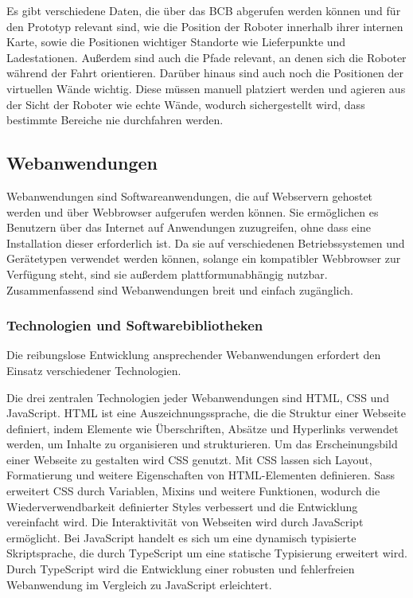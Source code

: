 Es gibt verschiedene Daten, die über das \ac{BCB} abgerufen werden können und für den Prototyp relevant sind, wie die Position der Roboter innerhalb ihrer internen Karte, sowie die Positionen wichtiger Standorte wie Lieferpunkte und Ladestationen. Außerdem sind auch die Pfade relevant, an denen sich die Roboter während der Fahrt orientieren. Darüber hinaus sind auch noch die Positionen der virtuellen Wände wichtig. Diese müssen manuell platziert werden und agieren aus der Sicht der Roboter wie echte Wände, wodurch sichergestellt wird, dass bestimmte Bereiche nie durchfahren werden.

\subsection{Webanwendungen}
Webanwendungen sind Softwareanwendungen, die auf Webservern gehostet werden und über Webbrowser aufgerufen werden können. Sie ermöglichen es Benutzern über das Internet auf Anwendungen zuzugreifen, ohne dass eine Installation dieser erforderlich ist. Da sie auf verschiedenen Betriebssystemen und Gerätetypen verwendet werden können, solange ein kompatibler Webbrowser zur Verfügung steht, sind sie außerdem plattformunabhängig nutzbar. Zusammenfassend sind Webanwendungen breit und einfach zugänglich.

\subsubsection{Technologien und Softwarebibliotheken}\label{sec:WebTechnologies}
Die reibungslose Entwicklung ansprechender Webanwendungen erfordert den Einsatz verschiedener Technologien.

Die drei zentralen Technologien jeder Webanwendungen sind \ac{HTML}, \ac{CSS} und JavaScript. \ac{HTML} ist eine Auszeichnungssprache, die die Struktur einer Webseite definiert, indem Elemente wie Überschriften, Absätze und Hyperlinks verwendet werden, um Inhalte zu organisieren und strukturieren. Um das Erscheinungsbild einer Webseite zu gestalten wird \ac{CSS} genutzt. Mit \ac{CSS} lassen sich Layout, Formatierung und weitere Eigenschaften von \ac{HTML}-Elementen definieren. \ac{Sass} erweitert \ac{CSS} durch Variablen, \gls{Mixins} und weitere Funktionen, wodurch die Wiederverwendbarkeit definierter Styles verbessert und die Entwicklung vereinfacht wird. Die Interaktivität von Webseiten wird durch JavaScript ermöglicht. Bei JavaScript handelt es sich um eine dynamisch typisierte Skriptsprache, die durch TypeScript um eine statische Typisierung erweitert wird. Durch TypeScript wird die Entwicklung einer robusten und fehlerfreien Webanwendung im Vergleich zu JavaScript erleichtert.

